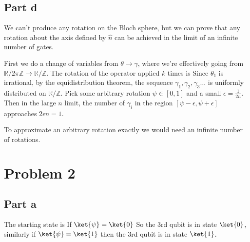 \subsection*{Part d}
We can't produce any rotation on the Bloch sphere, but we can prove that any rotation about the axis defined by $\hat{n}$ can be achieved in the limit of an infinite number of gates.

First we do a change of variables from $\theta \rightarrow \gamma$, where we're effectively going from $\mathbb{R}/2\pi \mathbb{Z}\rightarrow \mathbb{R}/\mathbb{Z}$.
\eq{
\theta &= \frac{\gamma}{2\pi}
}
The rotation of the operator applied $k$ times is
Since $\theta_1$ is irrational, by the equidistribution theorem, the sequence $\gamma_1, \gamma_2, \gamma_3 \dots$ is uniformly distributed on $\mathbb{R}/\mathbb{Z}$. Pick some arbitrary rotation $\psi \in [0,1]$ and a small $\epsilon = \frac{1}{2n}$. Then in the large $n$ limit, the number of $\gamma_i$ in the region $[\psi -\epsilon, \psi + \epsilon]$ approaches $2\epsilon n = 1$.

To approximate an arbitrary rotation exactly we would need an infinite number of rotations.

\pagebreak
\section*{Problem 2}
\subsection*{Part a}
The starting state is
If $\ket{\psi} = \ket{0}$
So the 3rd qubit is in state $\ket{0}$, similarly if $\ket{\psi} = \ket{1}$ then the 3rd qubit is in state $\ket{1}$.
